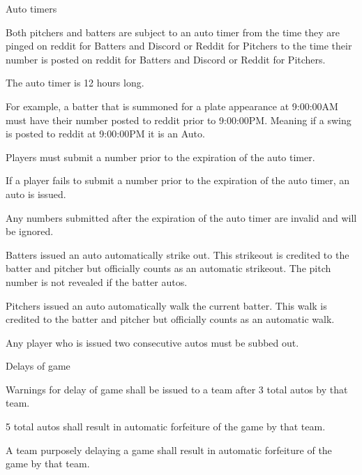 \begin{deepEnumerate}
\begin{deepEnumerate}
\begin{deepEnumerate}
		\end{deepEnumerate}
	\end{deepEnumerate}
	\item Auto timers
	\begin{deepEnumerate}
		\item Both pitchers and batters are subject to an auto timer from the time they are pinged on reddit for Batters and Discord or Reddit for Pitchers to the time their number is posted on reddit for Batters and Discord or Reddit for Pitchers. 
		\item The auto timer is 12 hours long.
		\begin{deepEnumerate}
			\item For example, a batter that is summoned for a plate appearance at 9:00:00AM must have their number posted to reddit prior to 9:00:00PM.  Meaning if a swing is posted to reddit at 9:00:00PM it is an Auto.
		\end{deepEnumerate}
		\item Players must submit a number prior to the expiration of the auto timer.
		\item If a player fails to submit a number prior to the expiration of the auto timer, an auto is issued.
		\begin{deepEnumerate}
			\item Any numbers submitted after the expiration of the auto timer are invalid and will be ignored.
			\item Batters issued an auto automatically strike out. This strikeout is credited to the batter and pitcher but officially counts as an automatic strikeout.
			The pitch number is not revealed if the batter autos.
			\item Pitchers issued an auto automatically walk the current batter. This walk is credited to the batter and pitcher but officially counts as an automatic walk.
		\end{deepEnumerate}
		\item Any player who is issued two consecutive autos must be subbed out.
		\item Delays of game
		\begin{deepEnumerate}
			\item Warnings for delay of game shall be issued to a team after 3 total autos by that team.
			\item 5 total autos shall result in automatic forfeiture of the game by that team.
			\item A team purposely delaying a game shall result in automatic forfeiture of the game by that team.

\end{deepEnumerate}
\end{deepEnumerate}
\end{deepEnumerate}
